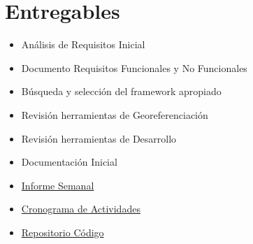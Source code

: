 \section{Entregables}

\begin{itemize}

	\item Análisis de Requisitos Inicial

	\item Documento Requisitos Funcionales y No Funcionales

	\item Búsqueda y selección del framework apropiado

	\item Revisión herramientas de Georeferenciación

	\item Revisión herramientas de Desarrollo 

	\item Documentación Inicial

	\item \href{https://github.com/smonsalve/Epi/blob/master/informes/Semana1/Informe1.pdf}{Informe Semanal}

	\item \href{https://github.com/smonsalve/Epi/blob/master/doc/Cronograma.md} {Cronograma de Actividades}

	\item \href{https://github.com/smonsalve/Epi}{Repositorio Código}

\end{itemize}